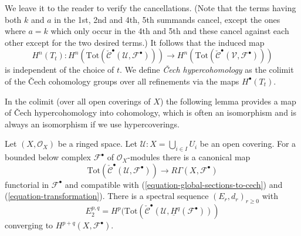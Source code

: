 We leave it to the reader to verify the cancellations. (Note that the
terms having both $k$ and $a$ in the 1st, 2nd and 4th, 5th summands
cancel, except the ones where $a = k$ which only occur in the 4th and 5th
and these cancel against each other except for the two desired terms.)
It follows that the induced map
$$
H^n(T_t) :
H^n(
\text{Tot}(\check{\mathcal{C}}^\bullet({\mathcal U}, {\mathcal F}^\bullet))
)
\to
H^n(
\text{Tot}(\check{\mathcal{C}}^\bullet({\mathcal V}, {\mathcal F}^\bullet))
)
$$
is independent of the choice of $t$. We define
{\it {\v C}ech hypercohomology} as the colimit of the
{\v C}ech cohomology groups
over all refinements via the maps $H^\bullet(T_t)$.

\medskip\noindent
In the colimit (over all open coverings of $X$) the following lemma provides
a map of {\v C}ech hypercohomology into cohomology, which is often an
isomorphism and is always an isomorphism if we use hypercoverings.

\begin{lemma}
\label{lemma-cech-complex-complex}
Let $(X, \mathcal{O}_X)$ be a ringed space.
Let $\mathcal{U} : X = \bigcup_{i \in I} U_i$ be
an open covering. For a bounded below complex $\mathcal{F}^\bullet$
of $\mathcal{O}_X$-modules there is a canonical map
$$
\text{Tot}(\check{\mathcal{C}}^\bullet(\mathcal{U}, \mathcal{F}^\bullet))
\longrightarrow
R\Gamma(X, \mathcal{F}^\bullet)
$$
functorial in $\mathcal{F}^\bullet$ and compatible with
(\ref{equation-global-sections-to-cech}) and (\ref{equation-transformation}).
There is a spectral sequence $(E_r, d_r)_{r \geq 0}$ with
$$
E_2^{p, q} =
H^p(\text{Tot}(\check{\mathcal{C}}^\bullet(\mathcal{U},
\underline{H}^q(\mathcal{F}^\bullet)))
$$
converging to $H^{p + q}(X, \mathcal{F}^\bullet)$.
\end{lemma}

